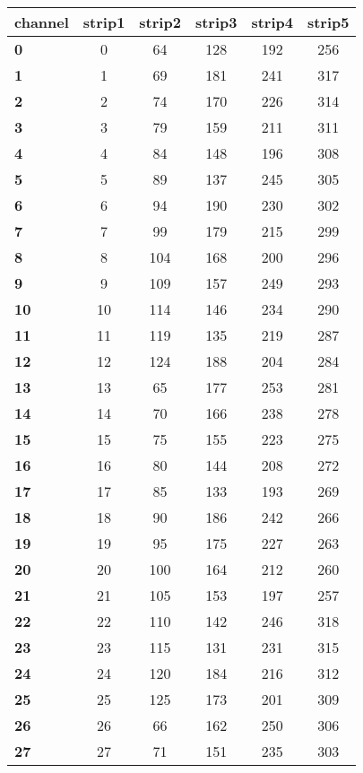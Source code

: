   \begin{longtable}{|l|c|c|c|c|c|}
    \hline
    \textbf{channel} & strip1 & strip2 & strip3 & strip4 & strip5 \\
    \hline
    \textbf{0} & 0 & 64 & 128 & 192 & 256 \\
    \textbf{1} & 1 & 69 & 181 & 241 & 317 \\
    \textbf{2} & 2 & 74 & 170 & 226 & 314 \\
    \textbf{3} & 3 & 79 & 159 & 211 & 311 \\
    \textbf{4} & 4 & 84 & 148 & 196 & 308 \\
    \textbf{5} & 5 & 89 & 137 & 245 & 305 \\
    \textbf{6} & 6 & 94 & 190 & 230 & 302 \\
    \textbf{7} & 7 & 99 & 179 & 215 & 299 \\
    \textbf{8} & 8 & 104 & 168 & 200 & 296 \\
    \textbf{9} & 9 & 109 & 157 & 249 & 293 \\
    \textbf{10} & 10 & 114 & 146 & 234 & 290 \\
    \textbf{11} & 11 & 119 & 135 & 219 & 287 \\
    \textbf{12} & 12 & 124 & 188 & 204 & 284 \\
    \textbf{13} & 13 & 65 & 177 & 253 & 281 \\
    \textbf{14} & 14 & 70 & 166 & 238 & 278 \\
    \textbf{15} & 15 & 75 & 155 & 223 & 275 \\
    \textbf{16} & 16 & 80 & 144 & 208 & 272 \\
    \textbf{17} & 17 & 85 & 133 & 193 & 269 \\
    \textbf{18} & 18 & 90 & 186 & 242 & 266 \\
    \textbf{19} & 19 & 95 & 175 & 227 & 263 \\
    \textbf{20} & 20 & 100 & 164 & 212 & 260 \\
    \textbf{21} & 21 & 105 & 153 & 197 & 257 \\
    \textbf{22} & 22 & 110 & 142 & 246 & 318 \\
    \textbf{23} & 23 & 115 & 131 & 231 & 315 \\
    \textbf{24} & 24 & 120 & 184 & 216 & 312 \\
    \textbf{25} & 25 & 125 & 173 & 201 & 309 \\
    \textbf{26} & 26 & 66 & 162 & 250 & 306 \\
    \textbf{27} & 27 & 71 & 151 & 235 & 303 \\

\end{longtable}
